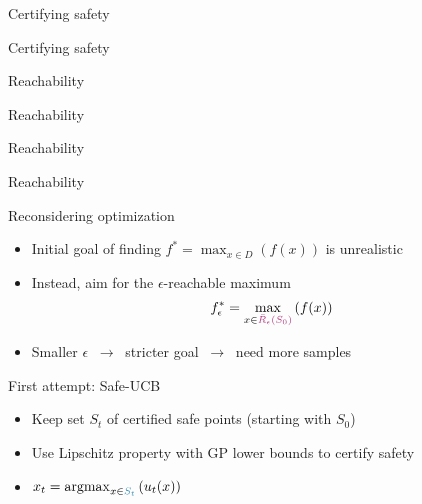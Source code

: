\documentclass[xetex,10pt,mathserif,handout]{beamer}
\newlength\figureheight
\newlength\figurewidth
\newcommand{\Rbeps}{\bar{R}_{\epsilon}}
\newcommand{\localucb}{{\sc\textsf{Safe-UCB}}\xspace}
\newcommand{\cst}{{\color{cyan!70!black}$S_t$}\xspace}
\newcommand{\ccst}{{\color{cyan!70!black}S_t}\xspace}
\newcommand{\ccrbeps}{{\color{magenta!70!black}\Rbeps(S_0)}\xspace}
\begin{document}
\begin{frame}{Certifying safety}
\centering
\setlength\figurewidth{5in}
\setlength\figureheight{3.5in}

\end{frame}

\begin{frame}{Certifying safety}
\centering
\setlength\figurewidth{5in}
\setlength\figureheight{3.5in}

\end{frame}

\begin{frame}{Reachability}
\centering
\setlength\figurewidth{5in}
\setlength\figureheight{3.5in}

\end{frame}

\begin{frame}{Reachability}
\centering
\setlength\figurewidth{5in}
\setlength\figureheight{3.5in}

\end{frame}

\begin{frame}{Reachability}
\centering
\setlength\figurewidth{5in}
\setlength\figureheight{3.5in}

\end{frame}

\begin{frame}{Reachability}
\centering
\setlength\figurewidth{5in}
\setlength\figureheight{3.5in}

\end{frame}

\begin{frame}{Reconsidering optimization}
\begin{itemize}
\item<1-> Initial goal of finding $f^* = \max_{x \in D}\left(f(x)\right)$ is unrealistic
\vspace{2em}
\item<2-> Instead, aim for the $\epsilon$-reachable maximum
\begin{align*}
  f_{\epsilon}^* = \max_{x \in \ccrbeps}\left(f(x)\right)
\end{align*}
\item<3-> Smaller $\epsilon$ $\ \rightarrow\ $ stricter goal $\ \rightarrow\ $ need more samples
\end{itemize}
\end{frame}

\begin{frame}{First attempt: \localucb}
\begin{itemize}
  \item<1-> Keep set \cst of certified safe points (starting with $S_0$)
  \vspace{2em}
  \item<2-> Use Lipschitz property with GP lower bounds to certify safety
  \vspace{2em}
  \item<3-> $x_t = \argmax_{x \in \ccst} \left( u_t(x) \right)$
\end{itemize}
\end{frame}
\end{document}
